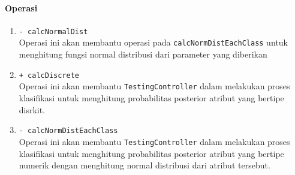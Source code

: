 \begin{enumerate}
	\paragraph{Operasi}
		\begin{enumerate}
			\item \texttt{- calcNormalDist}\\
			Operasi ini akan membantu operasi pada \texttt{calcNormDistEachClass} untuk menghitung fungsi normal distribusi dari parameter yang diberikan
			
			\item \texttt{+ calcDiscrete}\\
			Operasi ini akan membantu \texttt{TestingController} dalam melakukan proses klasifikasi untuk menghitung probabilitas posterior atribut yang bertipe disrkit.

			\item \texttt{- calcNormDistEachClass}\\
			Operasi ini akan membantu \texttt{TestingController} dalam melakukan proses klasifikasi untuk menghitung probabilitas posterior atribut yang bertipe numerik dengan menghitung normal distribusi dari atribut tersebut.

		\end{enumerate}
		
		


\end{enumerate}
	

